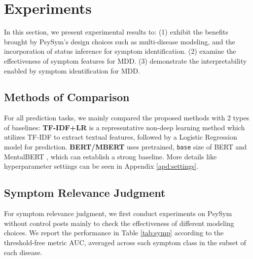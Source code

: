 \section{Experiments}
\label{sec:exp}

In this section, we present experimental results to: (1) exhibit the benefits brought by PsySym's design choices such as multi-disease modeling, and the incorporation of status inference for symptom identification. (2) examine the effectiveness of symptom features for MDD. (3) demonstrate the interpretability enabled by symptom identification for MDD.

\subsection{Methods of Comparison}

For all prediction tasks, we mainly compared the proposed methods with 2 types of baselines: \textbf{TF-IDF+LR} is a representative non-deep learning method which utilizes TF-IDF to extract textual features, followed by a Logistic Regression model for prediction. \textbf{BERT/MBERT} uses pretrained, \texttt{base} size of BERT and MentalBERT \citep{ji2021mentalbert}, which can establish a strong baseline. More details like hyperparameter settings can be seen in Appendix \ref{apd:settings}.

\subsection{Symptom Relevance Judgment}
\label{sec:relevance_exp}

For symptom relevance judgment, we first conduct experiments on PsySym without control posts mainly to check the effectiveness of different modeling choices. We report the performance in Table \ref{tab:symp} according to the threshold-free metric AUC, averaged across each symptom class in the subset of each disease.

